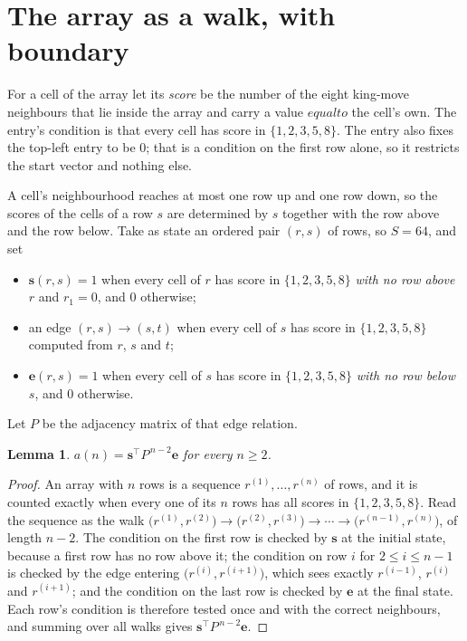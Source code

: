 \documentclass[11pt,a4paper]{article}
\theoremstyle{plain}
\newtheorem{lemma}[theorem]{Lemma}
\theoremstyle{definition}
\begin{document}
\section{The array as a walk, with boundary}

For a cell of the array let its \emph{score} be the number of the eight king-move neighbours that lie inside
the array and carry a value $equal to$ the cell's own. The entry's condition is that every cell
has score in $\{1,2,3,5,8\}$. The entry also fixes the top-left entry to be $0$; that is a condition on the first row alone, so it restricts the start vector and nothing else.

A cell's neighbourhood reaches at most one row up and one row down, so the scores of the
cells of a row $s$ are determined by $s$ together with the row above and the row below.
Take as state an ordered pair $(r,s)$ of rows, so $S=64$, and set
\begin{itemize}
\item $\mathbf{s}(r,s)=1$ when every cell of $r$ has score in $\{1,2,3,5,8\}$ \emph{with no row
above $r$} and $r_1=0$, and $0$ otherwise;
\item an edge $(r,s)\to(s,t)$ when every cell of $s$ has score in $\{1,2,3,5,8\}$ computed from
$r$, $s$ and $t$;
\item $\mathbf{e}(r,s)=1$ when every cell of $s$ has score in $\{1,2,3,5,8\}$ \emph{with no row
below $s$}, and $0$ otherwise.
\end{itemize}
Let $P$ be the adjacency matrix of that edge relation.

\begin{lemma}\label{lem:walk}
$a(n)=\mathbf{s}^{\!\top}P^{\,n-2}\mathbf{e}$ for every $n\ge2$.
\end{lemma}

\begin{proof}
An array with $n$ rows is a sequence $r^{(1)},\dots,r^{(n)}$ of rows, and it is counted
exactly when every one of its $n$ rows has all scores in $\{1,2,3,5,8\}$. Read the sequence as the
walk $\bigl(r^{(1)},r^{(2)}\bigr)\to\bigl(r^{(2)},r^{(3)}\bigr)\to\cdots\to
\bigl(r^{(n-1)},r^{(n)}\bigr)$, of length $n-2$. The condition on the first row is
checked by $\mathbf{s}$ at the initial state, because a first row has no row above it; the
condition on row $i$ for $2\le i\le n-1$ is checked by the edge entering
$\bigl(r^{(i)},r^{(i+1)}\bigr)$, which sees exactly $r^{(i-1)}$, $r^{(i)}$ and
$r^{(i+1)}$; and the condition on the last row is checked by $\mathbf{e}$ at the final
state. Each row's condition is therefore tested once and with the correct neighbours, and
summing over all walks gives $\mathbf{s}^{\!\top}P^{\,n-2}\mathbf{e}$.
\end{proof}
\end{document}
